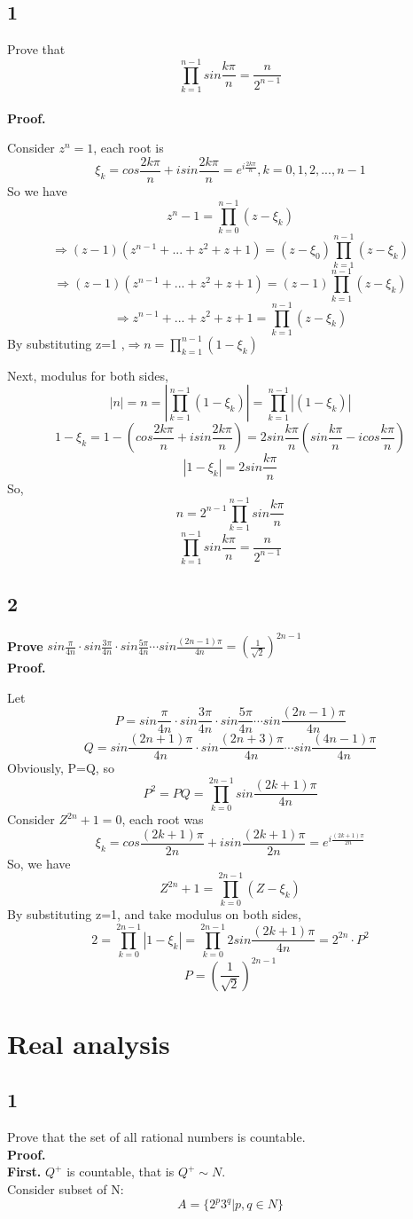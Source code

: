 \documentclass[11pt,a4paper]{article}
\begin{document}
\subsection{1}
Prove that $$\prod_{k=1}^{n-1}sin\frac{k\pi}{n} = \frac{n}{2^{n-1}} $$
\\\textbf{Proof.}

Consider $z^n=1$, each root is 
$$\xi_k = cos\frac{2k\pi}{n} + isin\frac{2k\pi}{n} = e^{i\frac{2k\pi}{n}}, k=0,1,2,...,n-1 $$
So we have
$$ z^n -1 = \prod_{k=0}^{n-1}(z-\xi_k)$$
$$\Longrightarrow (z-1)(z^{n-1}+...+z^2+z+1) = (z-\xi_0)\prod_{k=1}^{n-1}(z-\xi_k)$$
$$\Longrightarrow (z-1)(z^{n-1}+...+z^2+z+1) = (z-1)\prod_{k=1}^{n-1}(z-\xi_k)$$
$$\Longrightarrow z^{n-1}+...+z^2+z+1 = \prod_{k=1}^{n-1}(z-\xi_k)$$
By substituting  z=1 ,$\Longrightarrow n = \prod_{k=1}^{n-1}(1-\xi_k) $

Next, modulus for both sides,
$$ |n| = n = |\prod_{k=1}^{n-1}(1-\xi_k)| = \prod_{k=1}^{n-1}|(1-\xi_k)|$$
$$ 1 - \xi_k = 1-(cos\frac{2k\pi}{n} + isin\frac{2k\pi}{n}) = 2sin\frac{k\pi}{n}(sin\frac{k\pi}{n} -icos\frac{k\pi}{n})$$
$$ |1 - \xi_k| = 2sin\frac{k\pi}{n} $$
So, 
$$ n = 2^{n-1}\prod_{k=1}^{n-1}sin\frac{k\pi}{n}$$
$$\prod_{k=1}^{n-1}sin\frac{k\pi}{n} = \frac{n}{2^{n-1}} $$

\subsection{2}
\textbf{Prove } $sin\frac{\pi}{4n}\cdot sin\frac{3\pi}{4n}\cdot sin\frac{5\pi}{4n}\cdots sin\frac{(2n-1)\pi}{4n} = (\frac{1}{\sqrt{2}})^{2n-1}$ 
\\\textbf{Proof.}

Let 
$$P=sin\frac{\pi}{4n}\cdot sin\frac{3\pi}{4n}\cdot sin\frac{5\pi}{4n}\cdots sin\frac{(2n-1)\pi}{4n}$$
$$Q=sin\frac{(2n+1)\pi}{4n}\cdot sin\frac{(2n+3)\pi}{4n}\cdots sin\frac{(4n-1)\pi}{4n}$$
Obviously, P=Q, so
$$ P^2 = PQ = \prod_{k=0}^{2n-1}sin\frac{(2k+1)\pi}{4n}$$
Consider $Z^{2n} +1 = 0$, each root was 
$$ \xi_k = cos\frac{(2k+1)\pi}{2n} + isin\frac{(2k+1)\pi}{2n}= e^{i\frac{(2k+1)\pi}{2n}}$$
So, we have
$$ Z^{2n} + 1 = \prod_{k=0}^{2n-1}(Z-\xi_k) $$
By substituting z=1, and take modulus on both sides, 
$$ 2 = \prod_{k=0}^{2n-1}|1-\xi_k| = \prod_{k=0}^{2n-1}2sin\frac{(2k+1)\pi}{4n} = 2^{2n}\cdot P^2$$
$$P=(\frac{1}{\sqrt{2}})^{2n-1}$$

\section{Real analysis}
\subsection{1}
Prove that the set of all rational numbers is countable.
\\\textbf{Proof.}
\\\textbf{First.} $Q^{+}$ is countable, that is $Q^{+} \sim N.$
\\Consider subset of N: 
$$ A=\{ 2^p3^q| p,q\in N\} $$
\end{document}
